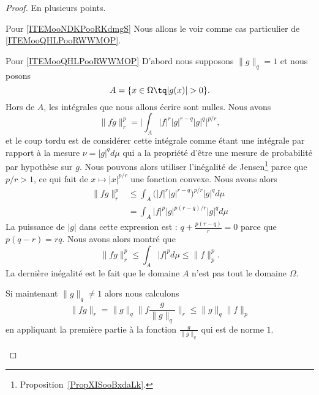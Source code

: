 \begin{proof}
	En plusieurs points.
	\begin{subproof}
		\item[Pour \ref{ITEMooNDKPooRKdmgS}]
		Nous allons le voir comme cas particulier de \ref{ITEMooQHLPooRWWMOP}.
		\item[Pour \ref{ITEMooQHLPooRWWMOP}]
		D'abord nous supposons \( \| g \|_q=1\) et nous posons
		\begin{equation}
			A=\{ x\in\Omega\tq | g(x) |>0 \}.
		\end{equation}
		Hors de \( A\), les intégrales que nous allons écrire sont nulles. Nous avons
		\begin{equation}
			\| fg \|_r^p=\Big|  \int_A| f |^r| g |^{r-q}| g |^q  \Big|^{p/r},
		\end{equation}
		et le coup tordu est de considérer cette intégrale comme étant une intégrale par rapport à la mesure \( \nu=| g |^qd\mu\) qui a la propriété d'être une mesure de probabilité par hypothèse sur \( g\). Nous pouvons alors utiliser l'inégalité de Jensen\footnote{Proposition~\ref{PropXISooBxdaLk}.} parce que \( p/r>1\), ce qui fait de \( x\mapsto | x |^{p/r}\) une fonction convexe. Nous avons alors
		\begin{subequations}
			\begin{align}
				\| fg \|_r^p & \leq\int_A\big( | f |^r| g |^{r-q} \big)^{p/r}| g |^qd\mu \\
				             & =\int_A| f |^{p}| g |^{p(r-q)/r}| g |^qd\mu
			\end{align}
		\end{subequations}
		La puissance de \( | g |\) dans cette expression est : \( q+\frac{ p(r-q) }{ r }=0\) parce que \( p(q-r)=rq\). Nous avons alors montré que
		\begin{equation}
			\| fg \|_r^p\leq \int_A| f |^pd\mu\leq \| f \|_p^p.
		\end{equation}
		La dernière inégalité est le fait que le domaine \( A\) n'est pas tout le domaine \( \Omega\).

		Si maintenant \( \| g \|_q\neq 1\) alors nous calculons
		\begin{equation}
			\| fg \|_r=\| g \|_q\| f\frac{ g }{ \| g \|_q } \|_r\leq \| g \|_q\| f \|_p
		\end{equation}
		en appliquant la première partie à la fonction \( \frac{ g }{ \| g \|_q }\) qui est de norme \( 1\).


\end{subproof}
\end{proof}

